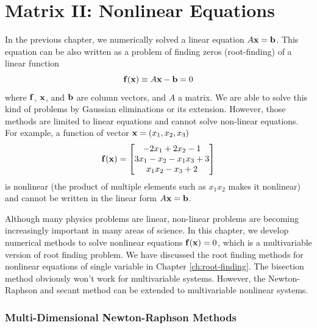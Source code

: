 \chapter{Matrix II: Nonlinear Equations}\label{ch:matrix-nonliear}

\normalsize

In the previous chapter, we numerically solved a linear equation $A \vb{x} = \vb{b}$.  This equation can be also written as a problem of finding zeros (root-finding) of a linear function
\begin{equation}\label{eq:linear_zero}
\vb{f}(\vb{x}) \equiv A \vb{x} - \vb{b} = 0
\end{equation}
where $\vb{f}$, $\vb{x}$, and $\vb{b}$ are column vectors, and $A$ a matrix.  We are able to solve this kind of problems by Gaussian eliminations or its extension.  However, those methods are limited to linear equations and cannot solve non-linear equations.
For example,  a function of vector $\vb{x}=(x_1,x_2,x_3)$
\begin{eqnarray}
\vb{f}(\vb{x}) = \begin{bmatrix} -2 x_1 + 2 x_2 - 1\\ 3 x_1 - x_2 - x_1 x_3 + 3\\ x_1 x_2 - x_3  + 2\end{bmatrix}
\end{eqnarray}
is nonlinear (the product of multiple elements such as $x_1 x_2$ makes it nonlinear) and cannot be written in the linear form $A \vb{x} = \vb{b}$.
 
Although many physics problems are linear, non-linear problems are becoming increasingly important in many areas of science.  In this chapter,
we develop numerical methods to solve nonlinear equations $\vb{f}(\vb{x})=0$, which is a multivariable version of root finding problem.  We have discussed the root finding methods for nonlinear equations of single variable in Chapter \ref{ch:root-finding}.  The bisection method obviously won't work for multivariable systems.  However, the Newton-Raphson and secant method can be extended to multivariable nonlinear systems.

\subsection{Multi-Dimensional Newton-Raphson Methods}

